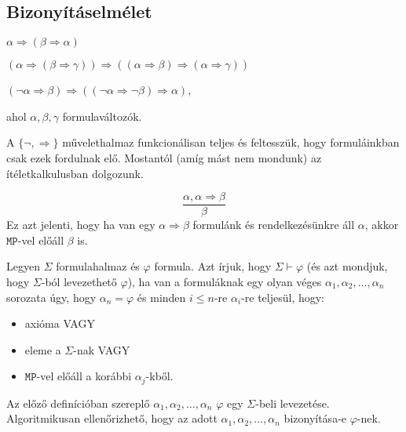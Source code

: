\subsection{Bizonyításelmélet}
\begin{defi}
\begin{minipage}[t]{\linewidth}
\begin{Axiom}
\item $\alpha \Rightarrow (\beta \Rightarrow \alpha)$ \label{axi:one}
\item $(\alpha \Rightarrow (\beta \Rightarrow \gamma)) \Rightarrow ((\alpha \Rightarrow \beta) \Rightarrow (\alpha \Rightarrow \gamma))$
\item $(\lnot \alpha \Rightarrow \beta) \Rightarrow ((\lnot \alpha \Rightarrow \lnot \beta) \Rightarrow \alpha)$,
\end{Axiom}
\end{minipage}
ahol $\alpha, \beta, \gamma$ formulaváltozók.
\end{defi}
\begin{megj}
A $\lbrace \lnot, \Rightarrow \rbrace$ művelethalmaz funkcionálisan teljes és feltesszük, hogy formuláinkban csak ezek fordulnak elő. Mostantól (amíg mást nem mondunk) az ítéletkalkulusban dolgozunk.
\end{megj}
\begin{defi} $$\frac{\alpha, \alpha \Rightarrow \beta}{\beta}$$ Ez azt jelenti, hogy ha van egy $\alpha \Rightarrow \beta$ formulánk és rendelkezésünkre áll $\alpha$, akkor $\mathtt{MP}$-vel előáll $\beta$ is.
\end{defi}
\begin{defi}
Legyen $\Sigma$ formulahalmaz és $\varphi$ formula. Azt írjuk, hogy $\Sigma \vdash \varphi$ (és azt mondjuk, hogy $\Sigma$-ból levezethető $\varphi$), ha van a formuláknak egy olyan véges $\alpha_1, \alpha_2, \ldots, \alpha_n$ sorozata úgy, hogy $\alpha_n = \varphi$ és minden $i \leqslant n$-re $\alpha_i$-re teljesül, hogy:
\begin{itemize}
\item axióma VAGY
\item eleme a $\Sigma$-nak VAGY
\item $\mathtt{MP}$-vel előáll a korábbi $\alpha_j$-kből.
\end{itemize} 
\end{defi}
\begin{megj}
Az előző definícióban szereplő $\alpha_1, \alpha_2, \ldots, \alpha_n$ $\varphi$ egy $\Sigma$-beli levezetése. Algoritmikusan ellenőrizhető, hogy az adott $\alpha_1, \alpha_2, \ldots, \alpha_n$ bizonyítása-e $\varphi$-nek.
\end{megj}
